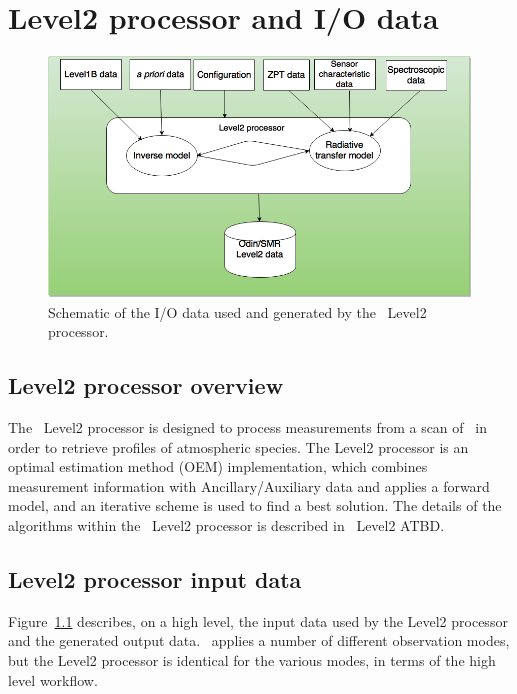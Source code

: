 \chapter{Level2 processor and I/O data}

\begin{figure}[t]
\centering
\includegraphics[width=14cm]{smr-level2-processor.png}
\caption{Schematic of the I/O data used and generated by the \smr\ Level2 processor.}
\label{fig:level2}
\end{figure}

\section{Level2 processor overview}

The \smr\ Level2 processor is designed to process
measurements from a scan of \smr\ in order to
retrieve profiles of atmospheric species.    
The Level2 processor is an optimal estimation method (OEM)
implementation, which combines measurement
information with Ancillary/Auxiliary data
and applies a forward model, and an iterative
scheme is used to find a best solution.   
The details of the algorithms within the
\smr\ Level2 processor is described in \smr\ Level2 ATBD.

\section{Level2 processor input data}

Figure~\ref{fig:level2} describes, on a high level, the input data used
by the Level2 processor and the generated output data.
\smr\ applies a number of different observation modes,
but the Level2 processor is identical for the various modes,
in terms of the high level workflow.

